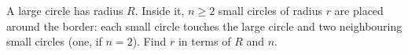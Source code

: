 A large circle has radius $R$. Inside it, $n\ge2$ small circles of radius $r$ are placed around the border: each small circle touches the large circle and two neighbouring small circles (one, if $n=2$). Find $r$ in terms of $R$ and $n$.
